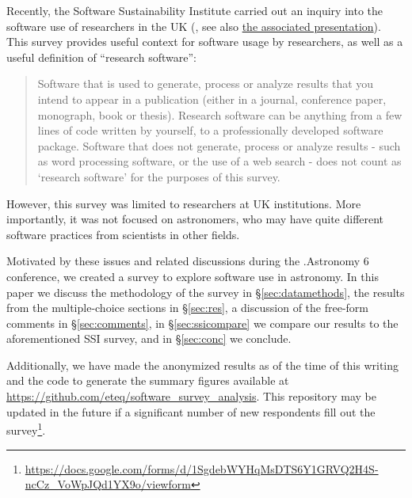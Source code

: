 Recently,  the Software Sustainability Institute carried out an inquiry into the software use of researchers in the UK  (\cite{f824cd98-b953-4c08-96c8-2533188bc4c4}, see also \href{http://wl.figshare.com/articles/1243288/embed?show_title=1}{the associated presentation}). This survey provides useful context for software usage by researchers, as well as a useful definition of ``research software'':
\begin{quote}
Software that is used to generate, process or analyze results that you intend to appear in a publication (either in a journal, conference paper, monograph, book or thesis). Research software can be anything from a few lines of code written by yourself, to a professionally developed software package. Software that does not generate, process or analyze results - such as word processing software, or the use of a web search - does not count as ‘research software’ for the purposes of this survey.
\end{quote}
However, this survey was limited to researchers at UK institutions.  More importantly, it was not focused on astronomers, who may have quite different software practices from scientists in other fields.

Motivated by these issues and related discussions during the .Astronomy 6 conference, we created a survey to explore software use in astronomy.  In this paper we discuss the methodology of the survey in \S \ref{sec:datamethods}, the results from the multiple-choice sections in \S \ref{sec:res}, a discussion of the free-form comments in \S \ref{sec:comments}, in \S \ref{sec:ssicompare} we compare our results to the aforementioned SSI survey, and in \S \ref{sec:conc} we conclude.

Additionally, we have made the anonymized results as of the time of this writing and the code to generate the summary figures available at \url{https://github.com/eteq/software_survey_analysis}. This repository may be updated in the future if a significant number of new respondents fill out the survey\footnote{\url{https://docs.google.com/forms/d/1SgdebWYHqMsDTS6Y1GRVQ2H4S-ncCz_VoWpJQd1YX9o/viewform}}.